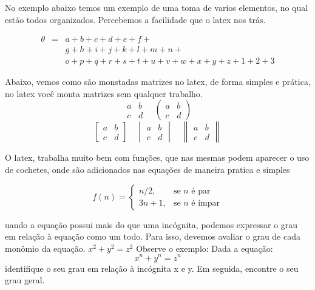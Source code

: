 \documentclass[
	article,			%
	11pt,				%
	oneside,			%
	a4paper,			%
	english,			%
	brazil,				%
	sumario=tradicional
	]{abntex2}
\begin{document}

No exemplo abaixo temos um exemplo de uma toma de varios elementos, no qual estão todos organizados. Percebemos a 
facilidade que o latex nos trás.

\begin{eqnarray*}
\theta &=& a+b+c+d+e+f+ \\
& & g+h+i+j+k+l+m+n+ \\
& & o+p+q+r+s+t+u+v+w+x+y+z+1+2+3
\end{eqnarray*}

Abaixo, vemos como são monstadas matrizes no latex, de forma simples e prática, no latex você monta matrizes sem
qualquer trabalho.
$$
\begin{matrix}
a & b \\
c & d
\end{matrix}
\quad
\begin{pmatrix}
a & b \\
c & d
\end{pmatrix}
$$
$$
\begin{bmatrix}
a & b \\
c & d
\end{bmatrix}
\quad
\begin{vmatrix}
a & b \\
c & d
\end{vmatrix}
\quad
\begin{Vmatrix}
a & b \\
c & d
\end{Vmatrix}
$$

O latex, trabalha muito bem com funções, que nas mesmas podem aparecer o uso de cochetes, onde são adicionados nas equações
de maneira pratica e simples 

\begin{equation}
f(n) = \left \{ \begin{matrix} n/2, & \mbox{se }n\mbox{ é par} \\ 3n+1, & \mbox{se }n\mbox{ é ímpar} \end{matrix} \right.
\end{equation}

uando a equação possui mais do que uma incógnita, podemos expressar o grau em relação à equação como um todo. Para isso, devemos avaliar o grau de cada monômio da equação. \(x^2 + y^2 = z^2\)  Observe o exemplo: Dada a equação: \[ x^n + y^n = z^n \] identifique o seu grau em relação à incógnita x e y. Em seguida, encontre o seu grau geral.
\end{document}
